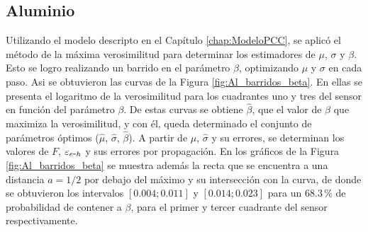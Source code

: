 \subsection{Aluminio}
\noindent Utilizando el modelo descripto en el Capítulo \ref{chap:ModeloPCC}, se aplicó el método de la máxima verosimilitud para determinar los estimadores de $\mu$, $\sigma$ y $\beta$. Esto se logro realizando un barrido en el parámetro $\beta$, optimizando $\mu$ y $\sigma$ en cada paso. Asi se obtuvieron las curvas de la Figura \ref{fig:Al_barridos_beta}. En ellas se presenta el logaritmo de la verosimilitud para los cuadrantes uno y tres del sensor en función del parámetro $\beta$. De estas curvas se obtiene $\hat{\beta}$, que el valor de $\beta$ que maximiza la verosimilitud, y con él, queda determinado el conjunto de parámetros óptimos ($\hat{\mu}$, $\hat{\sigma}$, $\hat{\beta}$). A partir de $\hat{\mu}$, $\hat{\sigma}$ y su errores, se determinan los valores de $F$, $\varepsilon_{e\mbox{-}h}$ y sus errores por propagación. En los gráficos de la Figura \ref{fig:Al_barridos_beta} se muestra además la recta que se encuentra a una distancia $a=1/2$ por debajo del máximo y su intersección con la curva, de donde se obtuvieron los intervalos $[0.004; 0.011]$ y $[0.014; 0.023]$ para un $68.3\,\%$ de probabilidad de contener a $\beta$, para el primer y tercer cuadrante del sensor respectivamente. 

